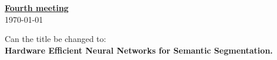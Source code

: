 \documentclass[14pt]{extarticle}
\begin{document}
\begin{center}
\begin{Large}

\underline{\textbf{Fourth meeting}}\\
\vspace{3mm}
\today

\end{Large}
\end{center}

Can the title be changed to:\\
\textbf{Hardware Efficient Neural Networks for Semantic Segmentation.}


\begin{thebibliography}{9}



 

\end{thebibliography}
\end{document}

